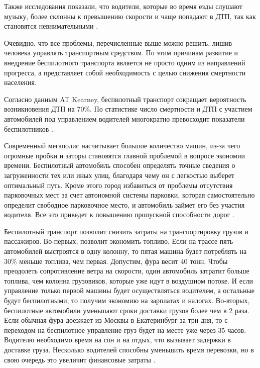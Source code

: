 Также исследования показали, что водители, которые во
время езды слушают музыку, более склонны к пре­вышению скорости и чаще попадают 
в ДТП, так как становятся невнимательными \cite{DTP_Gladkiy}.

Очевидно, что все проблемы, перечисленные выше можно решить, лишив человека 
управлять транспортным средством. По этим причинам развитие и внедрение 
беспилотного транспорта является не просто одним из направлений прогресса, а 
представляет собой необходимость с целью снижения смертности населения.

Согласно данным AT Kearney, беспилотный транспорт сокращает вероятность 
возникновения ДТП на 70\%. По
статистике число смертности и ДТП с участием автомобилей под управлением водителей
многократно превосходит показатели беспилотников \cite{Plus&Minus}.

Современный мегаполис насчитывает большое количество машин, из-за чего огромные
пробки и заторы становятся главной проблемой в вопросе экономии времени. Беспилотный
автомобиль способен определять точные сведения о загруженности тех или иных улиц,
благодаря чему он с легкостью выберет оптимальный путь. Кроме этого город избавиться от
проблемы отсутствия парковочных мест за счет автономной системы парковки, которая
самостоятельно определит свободное парковочное место, и автомобиль займет его без
участия водителя. Все это приведет к повышению пропускной способности дорог 
\cite{Pilotless_Trust}.

Беспилотный транспорт позволит снизить затраты на транспортировку грузов и
пассажиров. Во-первых, позволит экономить топливо. Если на трассе пять автомобилей
выстроятся в одну колонну, то пятая машина будет потреблять на 30\% меньше топлива, чем
первая. Допустим, фура весит 40 тонн. Чтобы преодолеть сопротивление ветра на скорости,
один автомобиль затратит больше топлива, чем колонна грузовиков, которые уже идут в
воздушном потоке. И если управление только первой машины будет осуществляться
водителем, а остальные будут беспилотными, то получим экономию на зарплатах и налогах.
Во-вторых, беспилотные автомобили уменьшают сроки доставки грузов более чем в 2
раза. Если обычная фура доезжает из Москвы в Екатеринбург за три дня, то с переходом на
беспилотное управление груз будет на месте уже через 35 часов. Водителю необходимо
время на сон и на отдых, что вызывает задержки в доставке груза. Несколько водителей
способны уменьшить время перевозки, но в свою очередь это увеличит финансовые 
затраты \cite{Pilotless_Future}.

